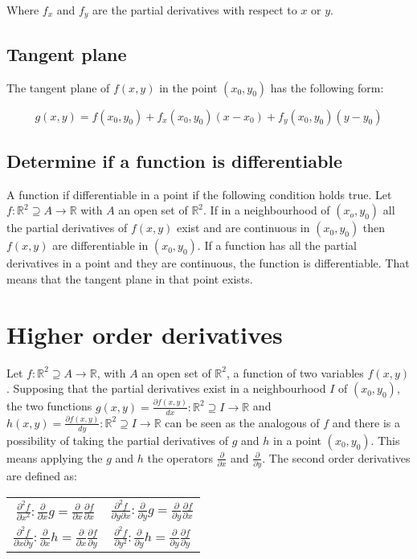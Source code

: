 	Where $f_x$ and $f_y$ are the partial derivatives with respect to $x$ or $y$.

	\subsection{Tangent plane}
	The tangent plane of $f(x,y)$ in the point $(x_0, y_0)$ has the following form:

	$$g(x,y) = f(x_0, y_0) + f_x(x_0, y_0)(x-x_0) + f_y(x_0, y_0)(y-y_0)$$

	\subsection{Determine if a function is differentiable}
	A function if differentiable in a point if the following condition holds true.
	Let $f:\mathbb{R}^2\supseteq A\rightarrow \mathbb{R}$ with $A$ an open set of $\mathbb{R}^2$.
	If in a neighbourhood of $(x_o, y_0)$ all the partial derivatives of $f(x, y)$ exist and are continuous in $(x_0, y_0)$ then $f(x,y)$ are differentiable in $(x_0, y_0)$.
	If a function has all the partial derivatives in a point and they are continuous, the function is differentiable.
	That means that the tangent plane in that point exists.

\section{Higher order derivatives}
Let $f:\mathbb{R}^2\supseteq A\rightarrow\mathbb{R}$, with $A$ an open set of $\mathbb{R}^2$, a function of two variables $f(x,y)$.
Supposing that the partial derivatives exist in a neighbourhood $I$ of $(x_0, y_0)$, the two functions $g(x,y) = \frac{\partial f(x,y)}{dx}:\mathbb{R}^2\supseteq I\rightarrow\mathbb{R}$ and $h(x,y) = \frac{\partial f(x,y)}{dy}:\mathbb{R}^2\supseteq I\rightarrow\mathbb{R}$ can be seen as the analogous of $f$ and there is a possibility of taking the partial derivatives of $g$ and $h$ in a point $(x_0, y_0)$.
This means applying the $g$ and $h$ the operators $\frac{\partial }{\partial x}$ and $\frac{\partial}{\partial y}$.
The second order derivatives are defined as:

\begin{table}[H]
	\begin{tabular}{c c}
		$\frac{\partial^2 f}{\partial x^2}: \frac{\partial}{\partial x}g = \frac{\partial}{\partial x}\frac{\partial f}{\partial x}$ &
		 $\frac{\partial^2 f}{\partial y\partial x}: \frac{\partial}{\partial y}g = \frac{\partial}{\partial y}\frac{\partial f}{\partial x}$ \\
		$\frac{\partial^2 f}{\partial x\partial y}: \frac{\partial}{\partial x}h = \frac{\partial}{\partial x}\frac{\partial f}{\partial y}$ &
		 $\frac{\partial^2 f}{\partial y^2}: \frac{\partial}{\partial y}h = \frac{\partial}{\partial y}\frac{\partial f}{\partial y}$\\
	\end{tabular}
	\centering
\end{table}

